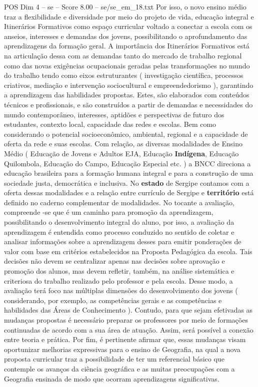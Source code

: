 \begin{textsample}{POS Dim 4 – se – Score 8.00 – se/se\_em\_18.txt}
Por isso, o novo ensino médio traz a flexibilidade e diversidade por meio do projeto de vida, educação integral e Itinerários Formativos como espaço curricular voltado a conectar a escola com os anseios, interesses e demandas dos jovens, possibilitando o aprofundamento das aprendizagens da formação geral.
A importância dos Itinerários Formativos está na articulação dessa com as demandas tanto do mercado de trabalho regional como das novas exigências ocupacionais geradas pelas transformações no mundo do trabalho tendo como eixos estruturantes ( investigação científica, processos criativos, mediação e intervenção sociocultural e empreendedorismo ), garantindo a aprendizagem das habilidades propostas.
Estes, são elaborados com conteúdos técnicos e profissionais, e são construídos a partir de demandas e necessidades do mundo contemporâneo, interesses, aptidões e perspectivas de futuro dos estudantes, contexto local, capacidade das redes e escolas.
Bem como considerando o potencial socioeconômico, ambiental, regional e a capacidade de oferta da rede e suas escolas.
Com relação, as diversas modalidades de Ensino Médio ( Educação de Jovens e Adultos EJA, Educação \textbf{Indígena}, Educação Quilombola, Educação do Campo, Educação Especial etc. ) a BNCC direciona a educação brasileira para a formação humana integral e para a construção de uma sociedade justa, democrática e inclusiva.
No \textbf{estado} de Sergipe contamos com a oferta dessas modalidades e a relação entre currículo de Sergipe e \textbf{território} está definido no caderno complementar de modalidades.
No tocante a avaliação, compreende -se que é um caminho para promoção da aprendizagem, possibilitando o desenvolvimento integral do aluno, por isso, a avaliação da aprendizagem é entendida como processo conduzido no sentido de coletar e analisar informações sobre a aprendizagem desses para emitir ponderações de valor com base em critérios estabelecidos na Proposta Pedagógica da escola.
Tais decisões não devem se centralizar apenas nas decisões sobre aprovação e promoção dos alunos, mas devem refletir, também, na análise sistemática e criteriosa do trabalho realizado pelo professor e pela escola.
Desse modo, a avaliação terá foco nas múltiplas dimensões do desenvolvimento dos jovens ( considerando, por exemplo, as competências gerais e as competências e habilidades das Áreas de Conhecimento ).
Contudo, para que sejam efetivadas as mudanças propostas é necessário preparar os professores por meio de formações continuadas de acordo com a sua área de atuação.
Assim, será possível a conexão entre teoria e prática.
Por fim, é pertinente afirmar que, essas mudanças visam oportunizar melhorias expressivas para o ensino de Geografia, na qual a nova proposta curricular traz a possibilidade de ter um referencial básico que contemple os avanços da ciência geográfica e as muitas preocupações com a Geografia ensinada de modo que ocorram aprendizagens significativas.

\end{textsample}
